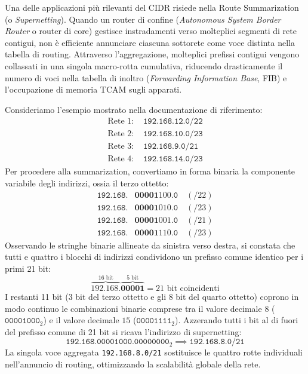 \documentclass[11pt, a4paper]{article}
\begin{document}
Una delle applicazioni più rilevanti del CIDR risiede nella Route Summarization (o \emph{Supernetting}). Quando un router di confine (\emph{Autonomous System Border Router} o router di core) gestisce instradamenti verso molteplici segmenti di rete contigui, non è efficiente annunciare ciascuna sottorete come voce distinta nella tabella di routing. Attraverso l'aggregazione, molteplici prefissi contigui vengono collassati in una singola macro-rotta cumulativa, riducendo drasticamente il numero di voci nella tabella di inoltro (\emph{Forwarding Information Base}, FIB) e l'occupazione di memoria TCAM sugli apparati.


Consideriamo l'esempio mostrato nella documentazione di riferimento:
\begin{align*}
\text{Rete 1: } & \texttt{192.168.12.0/22} \\
\text{Rete 2: } & \texttt{192.168.10.0/23} \\
\text{Rete 3: } & \texttt{192.168.9.0/21} \\
\text{Rete 4: } & \texttt{192.168.14.0/23}
\end{align*}
Per procedere alla summarization, convertiamo in forma binaria la componente variabile degli indirizzi, ossia il terzo ottetto:
\begin{align*}
\texttt{192.168.} & \mathbf{00001}100 \texttt{.0} \quad (/22) \\
\texttt{192.168.} & \mathbf{00001}010 \texttt{.0} \quad (/23) \\
\texttt{192.168.} & \mathbf{00001}001 \texttt{.0} \quad (/21) \\
\texttt{192.168.} & \mathbf{00001}110 \texttt{.0} \quad (/23)
\end{align*}
Osservando le stringhe binarie allineate da sinistra verso destra, si constata che tutti e quattro i blocchi di indirizzi condividono un prefisso comune identico per i primi 21 bit:
\[
\overbrace{192.168.}^{\text{16 bit}} \overbrace{\mathbf{00001}}^{\text{5 bit}} = 21 \text{ bit coincidenti}
\]
I restanti 11 bit (3 bit del terzo ottetto e gli 8 bit del quarto ottetto) coprono in modo continuo le combinazioni binarie comprese tra il valore decimale $8$ ($\texttt{00001000}_2$) e il valore decimale $15$ ($\texttt{00001111}_2$). Azzerando tutti i bit al di fuori del prefisso comune di 21 bit si ricava l'indirizzo di supernetting:
\[
\texttt{192.168.00001000.00000000}_2 \implies \boxed{\texttt{192.168.8.0/21}}
\]
La singola voce aggregata \texttt{192.168.8.0/21} sostituisce le quattro rotte individuali nell'annuncio di routing, ottimizzando la scalabilità globale della rete.
\end{document}
